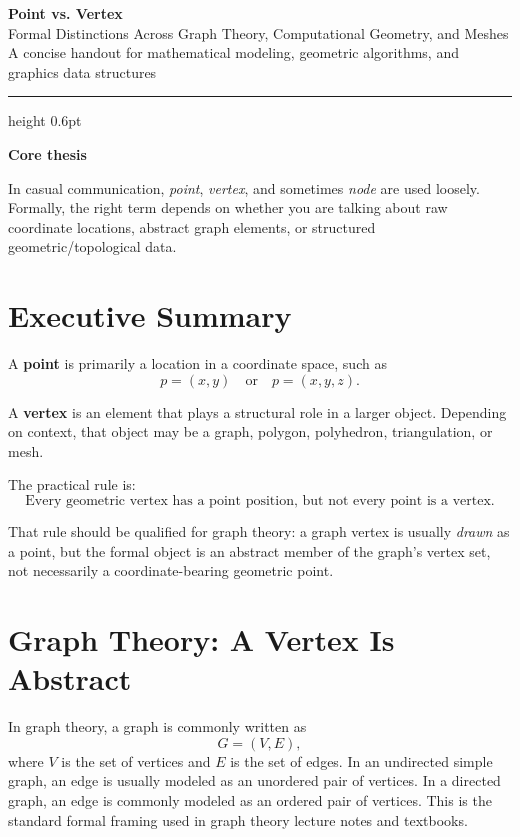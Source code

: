 \documentclass[11pt]{article}
\providecommand{\callout}[2]{%
  \vspace{4pt}%
  \noindent\colorbox{lightaccent}{%
    \parbox{0.965\linewidth}{%
      \textbf{\color{accent}#1}\par
      #2%
    }%
  }%
  \vspace{4pt}%
}
\providecommand{\calloutbox}[2]{\callout{#1}{#2}}
\begin{document}
\begin{center}
  {\LARGE\bfseries\color{accent} Point vs. Vertex}\\[3pt]
  {\large Formal Distinctions Across Graph Theory, Computational Geometry, and Meshes}\\[8pt]
  {\normalsize A concise handout for mathematical modeling, geometric algorithms, and graphics data structures}
\end{center}

\vspace{4pt}
\hrule height 0.6pt
\vspace{10pt}

\calloutbox{Core thesis}{In casual communication, \emph{point}, \emph{vertex}, and sometimes \emph{node} are used loosely. Formally, the right term depends on whether you are talking about raw coordinate locations, abstract graph elements, or structured geometric/topological data.}

\section{Executive Summary}

A \textbf{point} is primarily a location in a coordinate space, such as
\[
  p=(x,y) \quad \text{or} \quad p=(x,y,z).
\]

A \textbf{vertex} is an element that plays a structural role in a larger object. Depending on context, that object may be a graph, polygon, polyhedron, triangulation, or mesh.

The practical rule is:
\[
  \text{Every geometric vertex has a point position, but not every point is a vertex.}
\]

That rule should be qualified for graph theory: a graph vertex is usually \emph{drawn} as a point, but the formal object is an abstract member of the graph's vertex set, not necessarily a coordinate-bearing geometric point.

\section{Graph Theory: A Vertex Is Abstract}

In graph theory, a graph is commonly written as
\[
  G=(V,E),
\]
where \(V\) is the set of vertices and \(E\) is the set of edges. In an undirected simple graph, an edge is usually modeled as an unordered pair of vertices. In a directed graph, an edge is commonly modeled as an ordered pair of vertices. This is the standard formal framing used in graph theory lecture notes and textbooks.\cite{stanford_graph_basics,nagoya_graph_notes,grinberg_graph_notes}
\end{document}

